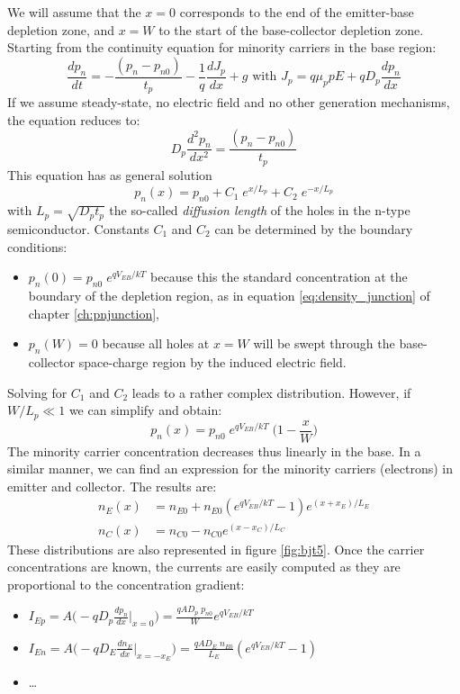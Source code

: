We will assume that the $x=0$ corresponds to the end of the emitter-base depletion zone, and $x=W$ to the start of the base-collector depletion zone. Starting from the continuity equation for minority carriers in the base region:
$$
\frac{dp_n}{dt} = - \frac{(p_n-p_{n0})}{t_p} - \frac{1}{q} \frac{d J_p}{dx} + g \text{ with }  J_p = q \mu_p p E + q D_p \frac{dp_n}{dx}
$$
If we assume steady-state, no electric field and no other generation mechanisms, the equation reduces to:
$$
D_p \frac{d^2 p_n}{dx^2} = \frac{(p_n-p_{n0})}{t_p}
$$
This equation has as general solution
$$
p_n(x) = p_{n0} + C_1  \; e^{x/L_p} + C_2 \;  e^{-x/L_p}
$$
with $L_p = \sqrt{D_p t_p}$ the so-called \emph{diffusion length} of the holes in the n-type semiconductor. Constants $C_1$ and $C_2$ can be determined by the boundary conditions:
\begin{itemize}
    \item $p_n(0) = p_{n0} \;  e^{qV_{EB}/kT}$ because this the standard concentration at the boundary of the depletion region, as in equation \ref{eq:density_junction} of chapter \ref{ch:pnjunction},
    \item $p_n(W) = 0$ because all holes at $x=W$ will be swept through the base-collector space-charge region by the induced electric field.
\end{itemize}
Solving for $C_1$ and $C_2$ leads to a rather complex distribution. However, if $W/L_p \ll 1$ we can simplify and obtain:
$$
p_n(x) = p_{n0}\; e^{qV_{EB}/kT} \; \Big(1 - \frac{x}{W} \Big)
$$
The minority carrier concentration decreases thus linearly in the base. In a similar manner, we can find an expression for the minority carriers (electrons) in emitter and collector. The results are:
\begin{equation}
    \begin{split}
        n_E(x) &= n_{E0} + n_{E0} (e^{qV_{EB}/kT} - 1) e^{(x+x_E)/L_E}\\
        n_C(x) &= n_{C0} - n_{C0} e^{(x-x_C)/L_C}
    \end{split}
\end{equation}
These distributions are also represented in figure \ref{fig:bjt5}. Once the carrier concentrations are known, the currents are easily computed as they are proportional to the concentration gradient:
\begin{itemize}
    \item $I_{Ep} = A \Big(-q D_p \frac{dp_n}{dx}|_{x=0}\Big) = \frac{qAD_p \; p_{n0}}{W} e^{qV_{EB}/kT}$
    \item $I_{En} = A \Big(-q D_E \frac{dn_E}{dx}|_{x=-x_E}\Big) = \frac{qAD_E \; n_{E0}}{L_E} (e^{qV_{EB}/kT}-1)$
    \item \ldots
\end{itemize}
